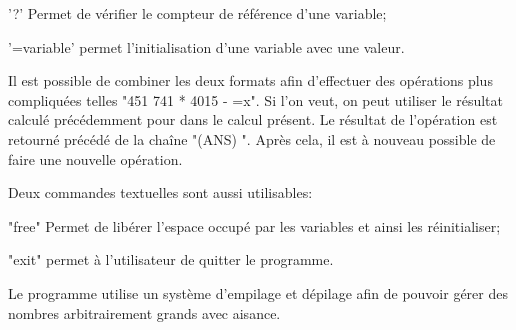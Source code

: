 \documentclass[]{report}
\begin{document}
\begin{normalsize}
		\begin{description}[noitemsep]
			\item \hspace{4mm}'?' Permet de vérifier le compteur de référence d'une variable;
			\item \hspace{4mm}'=variable' permet l'initialisation d'une variable avec une valeur.
		\end{description}
		\par Il est possible de combiner les deux formats afin d'effectuer des opérations plus compliquées telles "451 741 * 4015 - =x". Si l'on veut, on peut utiliser le résultat calculé précédemment pour dans le calcul présent. Le résultat de l'opération est retourné précédé de la chaîne "(ANS) ". Après cela, il est à nouveau possible de faire une nouvelle opération.
		\vspace{4mm}
		\par Deux commandes textuelles sont aussi utilisables:
		\begin{description}[noitemsep]
			\item \hspace{4mm}"free" Permet de libérer l'espace occupé par les variables et ainsi les réinitialiser;
			\item \hspace{4mm}"exit" permet à l'utilisateur de quitter le programme.
		\end{description}
	\par Le programme utilise un système d'empilage et dépilage afin de pouvoir gérer des nombres arbitrairement grands avec aisance.
		\vspace{4mm}
	\end{normalsize}
	\newpage
\end{document}
